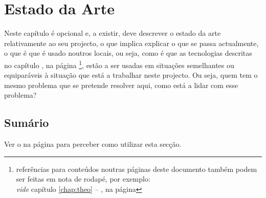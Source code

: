 \chapter{Estado da Arte}
\label{chap:art}

Neste capítulo é opcional e, a existir, deve descrever o estado da arte relativamente ao seu projecto, o que implica explicar o que se passa actualmente, o que é que é usado noutros locais, ou seja, como é que as tecnologias descritas no capítulo , na página \pageref{chap:theo}\footnote{referências para conteúdos noutras páginas deste documento também podem ser feitas em nota de rodapé, por exemplo:\\\emph{vide} capítulo \ref{chap:theo} -- , na página \pageref{chap:theo}}, estão a ser usadas em situações semelhantes ou equiparáveis à situação que está a trabalhar neste projecto. Ou seja, quem tem o mesmo problema que se pretende resolver aqui, como está a lidar com esse problema?


\section*{Sumário}

Ver o  na página \pageref{sec:intro_summary} para perceber como utilizar esta secção.
